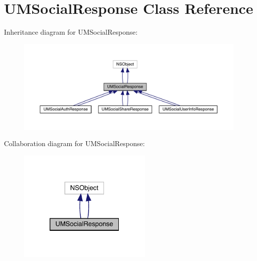 \hypertarget{interface_u_m_social_response}{}\section{U\+M\+Social\+Response Class Reference}
\label{interface_u_m_social_response}


Inheritance diagram for U\+M\+Social\+Response\+:\nopagebreak
\begin{figure}[H]
\begin{center}
\leavevmode
\includegraphics[width=350pt]{interface_u_m_social_response__inherit__graph}
\end{center}
\end{figure}


Collaboration diagram for U\+M\+Social\+Response\+:\nopagebreak
\begin{figure}[H]
\begin{center}
\leavevmode
\includegraphics[width=184pt]{interface_u_m_social_response__coll__graph}
\end{center}
\end{figure}
